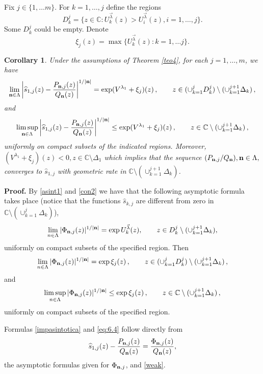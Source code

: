 \documentclass{amsart}
\newtheorem{cor}{\sc Corollary}[section]
\theoremstyle{definition}
\theoremstyle{remark}
\begin{document}
Fix $j \in \{1, \ldots m\}$. For  $k=1, \ldots ,j$ define the
regions
\[
D^j_k=\{z \in   {\mathbb{C}}  :
U^{\vec{\lambda}}_k(z)
> U^{\vec{\lambda}}_i(z), i= 1,\ldots,j \}.
\]
Some $D^j_k$ could be empty. Denote
\[
\xi_j(z)= \max \{ U^{\vec{\lambda}}_k(z): k=1, \ldots j \}.
\]




\begin{cor} \label{cor3} Under the assumptions of Theorem \ref{teo4}, for each $j=1,\ldots,m$, we have
\begin{equation}
\label{impasintotica} \lim_{{\bf n} \in \Lambda}
\left|\widehat{s}_{1,j}(z) - \frac{P_{{\bf n},j}(z)}{Q_{\bf n}(z)} \right|^{1/|{\bf n}|} = \exp (V^{\lambda_1}
+ \xi_j)(z)\,, \qquad z \in (\cup_{k=1}^j D^j_k) \setminus (\cup_{k=1}^{j+1} \Delta_k ) \,,
\end{equation}
and
\begin{equation} \label{eq:6.4} \limsup_{{\bf n} \in \Lambda}
\left|\widehat{s}_{1,j}(z) - \frac{P_{{\bf n},j}(z)}{Q_{\bf n}(z)} \right|^{1/|{\bf n}|} \leq \exp (V^{\lambda_1}
+ \xi_j)(z) \,, \qquad z \in \mathbb{C} \setminus (\cup_{k=1}^{j+1} \Delta_k )\,,
\end{equation}
uniformly on compact subsets   of the indicated regions. Moreover, $(V^{\lambda_1}
+ \xi_j)(z) < 0, z \in \mathbb{C} \setminus \Delta_1$ which implies that the sequence $({P_{{\bf n},j}}/{Q_{\bf n}}), {\bf n} \in \Lambda,$ converges to $\widehat{s}_{1,j}$ with geometric rate in  $\mathbb{C} \setminus (\cup_{k=1}^{j+1} \Delta_k )$.
\end{cor}

{\bf Proof.} By \eqref{asint1} and \eqref{con2}
we have that the following asymptotic formula takes place (notice that the functions $\widehat{s}_{k,j}$ are different from zero in ${\mathbb{C}} \setminus (\cup_{k=1}^j \Delta_k)$),
\[
\lim_{n \in
\Lambda}|{\Phi}_{ {\bf n},j}(z)|^{1/{|\bf n|}}=
\exp U^{\vec{\lambda}}_k(z), \qquad z \in D^j_k \setminus  (\cup_{k=1}^{j+1} \Delta_k),
\]
uniformly on compact subsets of the specified region. Then
\[ \lim_{n \in \Lambda}
| {\Phi}_{{\bf n},j}(z)|^{{1}/{|\bf n|}} = \exp
\xi_j(z)\,, \qquad z \in (\cup_{k=1}^j D^j_k) \setminus (\cup_{k=1}^{j+1} \Delta_k )\,,
\]
and
\[ \limsup_{n \in \Lambda}
|{\Phi}_{{\bf n},j}(z)|^{ {1}/{|\bf n|}} \leq \exp
\xi_j(z) \,, \qquad z \in \mathbb{C} \setminus (\cup_{k=1}^{j+1} \Delta_k )\,,
\]
uniformly on compact subsets of the specified region.


Formulas \eqref{impasintotica} and \eqref{eq:6.4} follow directly from
\[ \widehat{s}_{1,j}(z) - \frac{P_{{\bf n},j}(z)}{Q_{\bf n}(z)} = \frac{\Phi_{{\bf n},j}(z)}{Q_{\bf n}(z)},
\]
the asymptotic formulas given for $\Phi_{{\bf n},j}$,  and \eqref{weak}.
\end{document}
